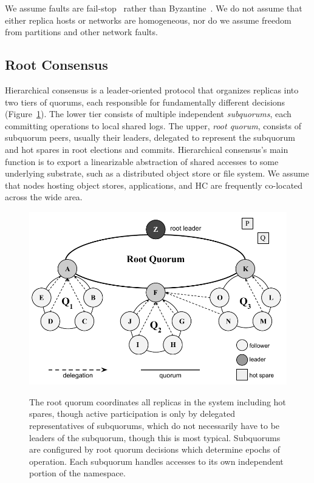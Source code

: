 We assume faults are fail-stop~\cite{fail-stop} rather than Byzantine~\cite{byzantine-generals}.
We do not assume that either replica hosts or networks are homogeneous, nor do we assume freedom from partitions and other network faults.


\subsection{Root Consensus}
\label{ch03_root_consensus}

Hierarchical consensus is a leader-oriented protocol that organizes replicas into two tiers of quorums, each responsible for fundamentally different decisions (Figure~\ref{fig:ch03_tiers}).
The lower tier consists of multiple independent \emph{subquorums}, each committing operations to local shared logs.
The upper, \emph{root quorum}, consists of subquorum peers, usually their leaders, delegated to represent the subquorum and hot spares in root elections and commits.
Hierarchical consensus's main function is to export a linearizable abstraction of shared accesses to some underlying substrate, such as a distributed object store or file system.
We assume that nodes hosting object stores, applications, and HC are frequently co-located across the wide area.

\begin{figure}
    \begin{center}
        \includegraphics[width=5in]{figures/ch03_election.pdf}
    \end{center}
    \renewcommand{\baselinestretch}{1}
    \small\normalsize

    \begin{quote}
        \caption[Root and Subquorum Composition]{The root quorum coordinates all replicas in the system including hot spares, though active participation is only by delegated representatives of subquorums, which do not necessarily have to be leaders of the subquorum, though this is most typical. Subquorums are configured by root quorum decisions which determine epochs of operation. Each subquorum handles accesses to its own independent portion of the namespace.}
        \label{fig:ch03_tiers}
    \end{quote}
\end{figure}
\renewcommand{\baselinestretch}{2}
\small\normalsize

